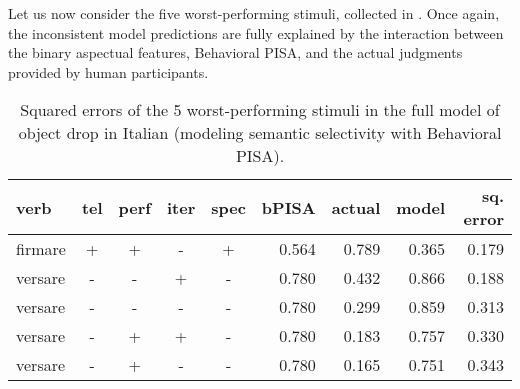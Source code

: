 Let us now consider the five worst-performing stimuli, collected in . Once again, the inconsistent model predictions are fully explained by the interaction between the binary aspectual features, Behavioral PISA, and the actual judgments provided by human participants.

\begin{table}[htb] %
\caption{Squared errors of the 5 worst-performing stimuli in the full model of object drop in Italian (modeling semantic selectivity with Behavioral PISA).}
\begin{tabular}{l|ccccr|rrr}
\textbf{verb}  & \textbf{tel} & \textbf{perf} & \textbf{iter} & \textbf{spec} & \textbf{bPISA}   & \textbf{actual} & \textbf{model} & \textbf{sq. error} \\
\hline
firmare & +  & +   & -   & +     & 0.564 & 0.789  & 0.365     & 0.179         \\
versare & -  & -   & +   & -     & 0.780  & 0.432  & 0.866     & 0.188         \\
versare & -  & -   & -   & -     & 0.780  & 0.299  & 0.859     & 0.313         \\
versare & -  & +   & +   & -     & 0.780  & 0.183  & 0.757     & 0.330          \\
versare & -  & +   & -   & -     & 0.780  & 0.165  & 0.751     & 0.343        
\end{tabular}
\end{table}


